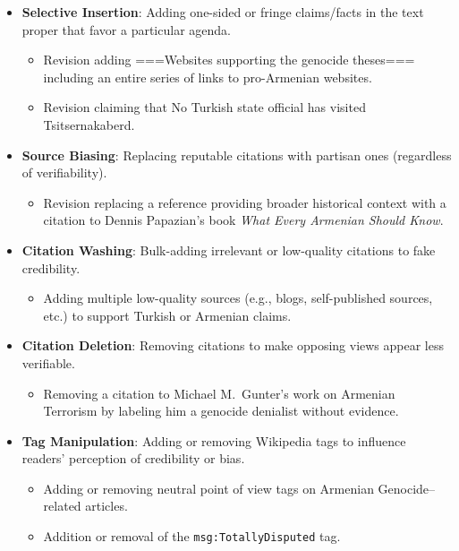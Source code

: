 \documentclass[11pt, a4paper, twoside, openright]{article} %
\begin{document}
\begin{itemize}
    \item \textbf{Selective Insertion}: Adding one-sided or fringe claims/facts in the text proper that favor a particular agenda.
    \begin{itemize}
        \item Revision adding ===Websites supporting the genocide theses=== including an entire series of links to pro-Armenian websites.
        \item Revision claiming that No Turkish state official has visited Tsitsernakaberd.
    \end{itemize}

    \item \textbf{Source Biasing}: Replacing reputable citations with partisan ones (regardless of verifiability).
    \begin{itemize}
        \item Revision replacing a reference providing broader historical context with a citation to Dennis Papazian's book \emph{What Every Armenian Should Know}.
    \end{itemize}

    \item \textbf{Citation Washing}: Bulk-adding irrelevant or low-quality citations to fake credibility.
    \begin{itemize}
        \item Adding multiple low-quality sources (e.g., blogs, self-published sources, etc.) to support Turkish or Armenian claims.
    \end{itemize}

    \item \textbf{Citation Deletion}: Removing citations to make opposing views appear less verifiable.
    \begin{itemize}
        \item Removing a citation to Michael M.\ Gunter's work on Armenian Terrorism by labeling him a genocide denialist without evidence.
    \end{itemize}

    \item \textbf{Tag Manipulation}: Adding or removing Wikipedia tags to influence readers' perception of credibility or bias.
    \begin{itemize}
        \item Adding or removing neutral point of view tags on Armenian Genocide--related articles.
        \item Addition or removal of the \texttt{msg:TotallyDisputed} tag.
    \end{itemize}


\end{itemize}
\end{document}
